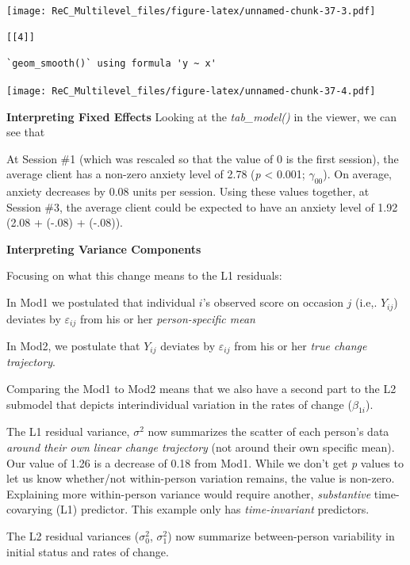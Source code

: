 \documentclass[
  11pt,
]{book}
\begin{document}
\texttt{[image: ReC\_Multilevel\_files/figure-latex/unnamed-chunk-37-3.pdf]}

\begin{verbatim}
[[4]]
\end{verbatim}

\begin{verbatim}
`geom_smooth()` using formula 'y ~ x'
\end{verbatim}

\texttt{[image: ReC\_Multilevel\_files/figure-latex/unnamed-chunk-37-4.pdf]}

\textbf{Interpreting Fixed Effects}
Looking at the \emph{tab\_model()} in the viewer, we can see that

At Session \#1 (which was rescaled so that the value of 0 is the first session), the average client has a non-zero anxiety level of 2.78 (\emph{p} \textless{} 0.001; \(\gamma _{00}\)). On average, anxiety decreases by 0.08 units per session. Using these values together, at Session \#3, the average client could be expected to have an anxiety level of 1.92 (2.08 + (-.08) + (-.08)).

\textbf{Interpreting Variance Components}

Focusing on what this change means to the L1 residuals:

In Mod1 we postulated that individual \(i\)'s observed score on occasion \(j\) (i.e,. \(Y_{ij}\)) deviates by \(\varepsilon _{ij}\) from his or her \emph{person-specific mean}

In Mod2, we postulate that \(Y_{ij}\) deviates by \(\varepsilon _{ij}\) from his or her \emph{true change trajectory}.

Comparing the Mod1 to Mod2 means that we also have a second part to the L2 submodel that depicts interindividual variation in the rates of change (\(\beta _{1i}\)).

The L1 residual variance, \(\sigma^{2}\) now summarizes the scatter of each person's data \emph{around their own linear change trajectory} (not around their own specific mean). Our value of 1.26 is a decrease of 0.18 from Mod1. While we don't get \emph{p} values to let us know whether/not within-person variation remains, the value is non-zero. Explaining more within-person variance would require another, \emph{substantive} time-covarying (L1) predictor. This example only has \emph{time-invariant} predictors.

The L2 residual variances (\(\sigma_{0 }^{2}\), \(\sigma_{1 }^{2}\)) now summarize between-person variability in initial status and rates of change.
\end{document}
